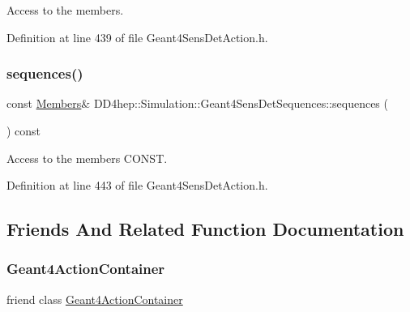 Access to the members. 



Definition at line 439 of file Geant4\+Sens\+Det\+Action.\+h.

\hypertarget{class_d_d4hep_1_1_simulation_1_1_geant4_sens_det_sequences_a48953184c7be01b66b1d6ecc69e99eaf}{}\label{class_d_d4hep_1_1_simulation_1_1_geant4_sens_det_sequences_a48953184c7be01b66b1d6ecc69e99eaf} 
\subsubsection{\texorpdfstring{sequences()}{sequences()}\hspace{0.1cm}{\footnotesize\ttfamily [2/2]}}
{\footnotesize\ttfamily const \hyperlink{class_d_d4hep_1_1_simulation_1_1_geant4_sens_det_sequences_a2266138a517dd9b784af9234312fdd12}{Members}\& D\+D4hep\+::\+Simulation\+::\+Geant4\+Sens\+Det\+Sequences\+::sequences (\begin{DoxyParamCaption}{ }\end{DoxyParamCaption}) const\hspace{0.3cm}{\ttfamily [inline]}}



Access to the members C\+O\+N\+ST. 



Definition at line 443 of file Geant4\+Sens\+Det\+Action.\+h.



\subsection{Friends And Related Function Documentation}
\hypertarget{class_d_d4hep_1_1_simulation_1_1_geant4_sens_det_sequences_a17a3e017d1d61a4f615d4e8eef0f98cb}{}\label{class_d_d4hep_1_1_simulation_1_1_geant4_sens_det_sequences_a17a3e017d1d61a4f615d4e8eef0f98cb} 
\subsubsection{\texorpdfstring{Geant4\+Action\+Container}{Geant4ActionContainer}}
{\footnotesize\ttfamily friend class \hyperlink{class_d_d4hep_1_1_simulation_1_1_geant4_action_container}{Geant4\+Action\+Container}\hspace{0.3cm}{\ttfamily [friend]}}



